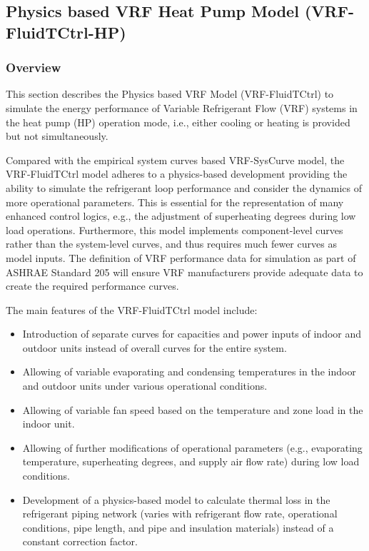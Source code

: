\subsection{Physics based VRF Heat Pump Model (VRF-FluidTCtrl-HP)}\label{VRF-FluidTCtrl-HP}

\subsubsection{Overview}\label{VRF-FluidTCtrl-HP-overview}

This section describes the Physics based VRF Model (VRF-FluidTCtrl) to simulate the energy performance of Variable Refrigerant Flow (VRF) systems in the heat pump (HP) operation mode, i.e., either cooling or heating is provided but not simultaneously. 

Compared with the empirical system curves based VRF-SysCurve model, the VRF-FluidTCtrl model adheres to a physics-based development providing the ability to simulate the refrigerant loop performance and consider the dynamics of more operational parameters. This is essential for the representation of many enhanced control logics, e.g., the adjustment of superheating degrees during low load operations. Furthermore, this model implements component-level curves rather than the system-level curves, and thus requires much fewer curves as model inputs. The definition of VRF performance data for simulation as part of ASHRAE Standard 205 will ensure VRF manufacturers provide adequate data to create the required performance curves. 

The main features of the VRF-FluidTCtrl model include:

\begin{itemize}
  \item
   Introduction of separate curves for capacities and power inputs of indoor and outdoor units instead of overall curves for the entire system.
 \item
   Allowing of variable evaporating and condensing temperatures in the indoor and outdoor units under various operational conditions.
\item
  Allowing of variable fan speed based on the temperature and zone load in the indoor unit.
\item
  Allowing of further modifications of operational parameters (e.g., evaporating temperature, superheating degrees, and supply air flow rate) during low load conditions.
\item
  Development of a physics-based model to calculate thermal loss in the refrigerant piping network (varies with refrigerant flow rate, operational conditions, pipe length, and pipe and insulation materials) instead of a constant correction factor.
\end{itemize}

